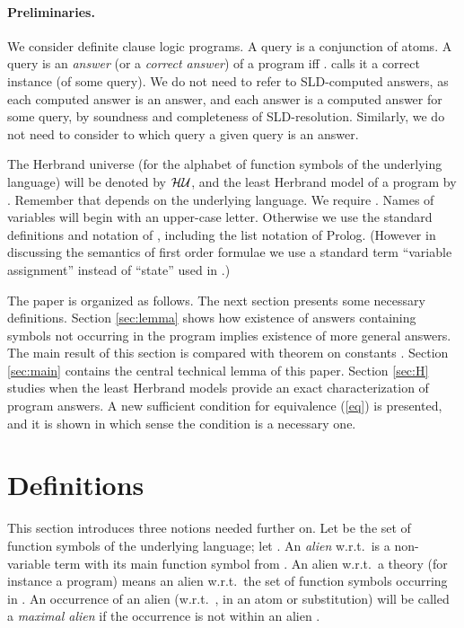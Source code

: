 \documentclass[a4paper]{tlp2}
\newcommand*{\HU}{{\ensuremath{\cal H U}}\xspace}
\begin{document}
\paragraph{Preliminaries.}

We consider definite clause logic programs.  A query is a conjunction of atoms.
A query   is an {\em answer} (or a {\em correct answer}) of a program   
iff .
 calls it a correct instance (of some query).
We do not need to refer to SLD-computed answers, as
each computed answer is an
answer, and each answer is a computed answer for some query,
by soundness and completeness of SLD-resolution.
Similarly, we do not need to consider to which query  a given query is
an answer.



The Herbrand universe
(for the alphabet of function symbols of the underlying language) 
will be denoted by \HU, and the least Herbrand model of a program  by .
Remember that  depends on the underlying language.
We require .
Names of variables will begin with an upper-case letter.
Otherwise we use the standard definitions and notation of \cite{Apt-Prolog},
including the list notation of Prolog.
(However in discussing the semantics of first order formulae we use a
standard term ``variable assignment'' instead of ``state'' 
used in \cite{Apt-Prolog}.)



The paper is organized as follows.  The next section presents some 
necessary definitions.
Section \ref{sec:lemma} 
shows how existence of answers containing symbols not occurring in the program
implies existence of more general answers.  The main result of this section
is compared with theorem on constants \cite{shoenfield67}.
Section \ref{sec:main}
contains the central technical lemma of this paper.
Section \ref{sec:H}
studies when the least Herbrand models provide an exact characterization of
program answers.  A new sufficient condition for equivalence
(\ref{eq}) is presented, and it is shown in which sense the condition is a
necessary one.





\section{Definitions}



This section introduces three notions needed further on.
Let  be the set of function symbols of the underlying language;
let .  An {\em alien} w.r.t.\   
is a non-variable term with its main function symbol from .
An alien w.r.t.\ a theory  (for instance a program)
means an alien w.r.t.\ the set of function symbols occurring in .
An occurrence of an alien  (w.r.t.\ , in an atom or substitution)
will be called a {\em maximal alien} if the occurrence is not within
an alien .
\end{document}
